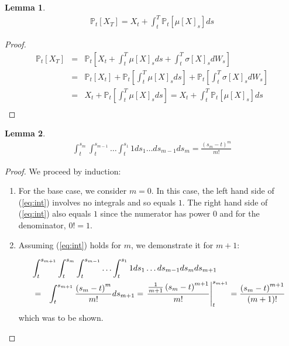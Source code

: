 \documentclass{article}
\newtheorem{lem}{Lemma}
\newcommand{\bra}[1]{\left[#1\right]}
\renewcommand{\P}[1]{\mathbb{P}_t\bra{#1}}
\newcommand{\mub}[1]{\mu\bra{#1}}
\newcommand{\sigmab}[1]{\sigma\bra{#1}}
\begin{document}
\begin{lem}\label{lem:Ito}
  \begin{eqnarray*}
    \P{X_T} = X_t + \int_t^T\P{\mub{X}_s}ds
  \end{eqnarray*}
\end{lem}
\begin{proof}
  \begin{eqnarray*}
    \P{X_T} & = & \P{X_t + \int_t^T \mub{X}_s ds + \int_t^T\sigmab{X}_s dW_s}\\
    & = & \P{X_t} + \P{\int_t^T \mub{X}_s ds} + \P{\int_t^T\sigmab{X}_s dW_s}\\
    & = & X_t + \P{\int_t^T \mub{X}_s ds} = X_t + \int_t^T \P{\mub{X}_s} ds\\
  \end{eqnarray*}
\end{proof}

\begin{lem}\label{lem:integral}
  \begin{eqnarray}
    \int_t^{s_m} \int_t^{s_{m-1}} \ldots \int_t^{s_1} 1 ds_1 \ldots ds_{m-1} ds_m = \frac{\left(s_m - t\right)^m}{m!}\label{eq:int}
  \end{eqnarray}
\end{lem}
\begin{proof}
  We proceed by induction:

  \begin{enumerate}
  \item
    For the base case, we consider $m=0$.
    In this case, the left hand side of (\ref{eq:int}) involves no integrals and so equals $1$.
    The right hand side of (\ref{eq:int}) also equals $1$ since the numerator has power $0$ and for the denominator, $0! = 1$.

  \item
    Assuming (\ref{eq:int}) holds for $m$, we demonstrate it for $m+1$:

    \begin{eqnarray*}
      \lefteqn{\int_t^{s_{m+1}} \int_t^{s_m} \int_t^{s_{m-1}} \ldots \int_t^{s_1} 1 ds_1 \ldots ds_{m-1} ds_m ds_{m+1}}\\
      & = & \int_t^{s_{m+1}} \frac{\left(s_m - t\right)^m}{m!} ds_{m+1} = \left.\frac{\frac{1}{m+1} \left(s_m - t\right)^{m+1}}{m!}\right|_t^{s_{m+1}} = \frac{\left(s_m - t\right)^{m+1}}{(m+1)!}
    \end{eqnarray*}
    which was to be shown.
  \end{enumerate}
\end{proof}
\end{document}
